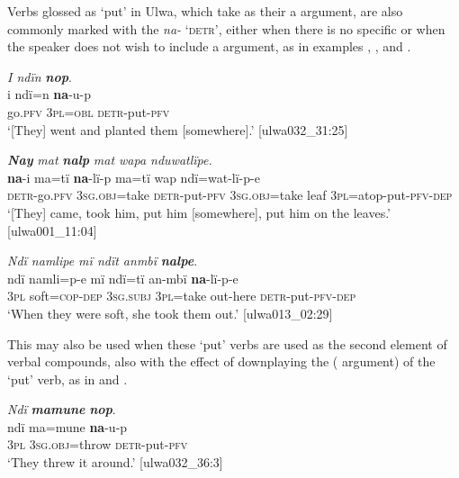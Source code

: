 Verbs glossed as ‘put’ in Ulwa, which take as their  a  argument, are also commonly marked with the  \textit{na-} \textsc{‘detr’}, either when there is no specific  or when the speaker does not wish to include a  argument, as in examples , , and .


\ea%
    \label{ex:syntax:312}
          \textit{I ndïn} \textbf{\textit{nop}}.\\
\gll i    ndï=n    \textbf{na}{}-u-p\\
    go.\textsc{pfv}  3\textsc{pl=obl}  \textsc{detr}{}-put-\textsc{pfv}\\
\glt `[They] went and planted them [somewhere].’ [ulwa032\_31:25]
\z

\newpage

\ea%
    \label{ex:syntax:313}
          \textbf{\textit{Nay}} \textit{mat} \textbf{\textit{nalp}} \textit{mat wapa nduwatlïpe.}\\
\gll    \textbf{na}{}-i      ma=tï      \textbf{na}{}-lï{}-p      ma=tï      wap ndï=wat-lï-p-e\\
    \textsc{detr}{}-go.\textsc{pfv}  3\textsc{sg.obj}=take  \textsc{detr-}put-\textsc{pfv}  \textsc{3sg.obj=}take  leaf          \textsc{3pl}=atop-put-\textsc{pfv-dep}\\
\glt `[They] came, took him, put him [somewhere], put him on the leaves.’ [ulwa001\_11:04]
\z

\ea%
    \label{ex:syntax:314}
          \textit{Ndï namlipe mï ndït anmbï} \textbf{\textit{nalpe}}.\\
\gll ndï  namli=p-e    mï      ndï=tï    an-mbï     \textbf{na}{}-lï{}-p-e\\
    3\textsc{pl}  soft=\textsc{cop-dep}  \textsc{3sg.subj}  \textsc{3pl}=take  out-here    \textsc{detr}{}-put-\textsc{pfv-dep}\\
\glt `When they were soft, she took them out.’ [ulwa013\_02:29]
\z

This  may also be used when these ‘put’ verbs are used as the second element of verbal compounds, also with the effect of downplaying the  ( argument) of the ‘put’ verb, as in  and .

\ea%
    \label{ex:syntax:315}
          \textit{Ndï} \textbf{\textit{mamune}} \textbf{\textit{nop}}.\\
\gll ndï  ma=mune      \textbf{na}{}-u-p\\
    3\textsc{pl}  \textsc{3sg.obj}=throw  \textsc{detr}{}-put-\textsc{pfv}\\
\glt `They threw it around.’ [ulwa032\_36:3]
\z

